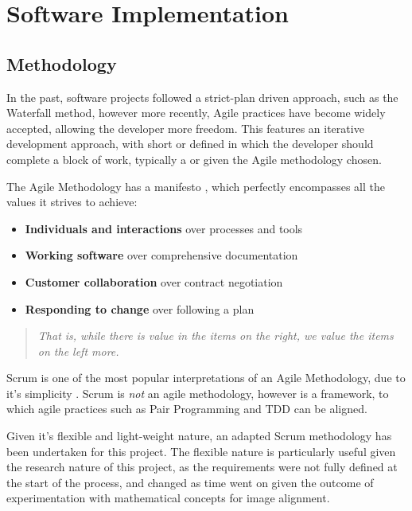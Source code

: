 \section{Software Implementation}

\subsection{Methodology}

In the past, software projects followed a strict-plan driven approach, such as the Waterfall method, however more recently, Agile practices have become widely accepted, allowing the developer more freedom. This features an iterative development approach, with short  or  defined in which the developer should complete a block of work, typically a  or  given the Agile methodology chosen.

The Agile Methodology has a manifesto \cite{Manifesto}, which perfectly encompasses all the values it strives to achieve:
\begin{itemize}
  \item \textbf{Individuals and interactions} over processes and tools
  \item \textbf{Working software} over comprehensive documentation
  \item \textbf{Customer collaboration} over contract negotiation
  \item \textbf{Responding to change} over following a plan
\end{itemize}

\begin{quotation}
  \textit{That is, while there is value in the items on the right, we value the items on the left more.}
\end{quotation}

Scrum is one of the most popular interpretations of an Agile Methodology, due to it's simplicity \cite{scrum}. Scrum is \textit{not} an agile methodology, however is a framework, to which agile practices such as Pair Programming and \acrfull{TDD} can be aligned.

Given it's flexible and light-weight nature, an adapted Scrum methodology has been undertaken for this project. The flexible nature is particularly useful given the research nature of this project, as the requirements were not fully defined at the start of the process, and changed as time went on given the outcome of experimentation with mathematical concepts for image alignment.

